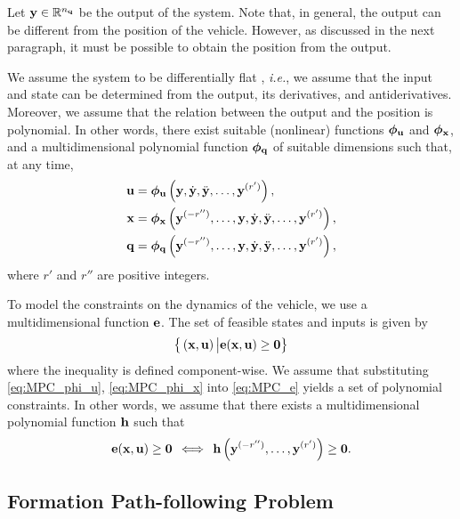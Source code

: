 Let $\mathbf{y} \in \mathbb{R}^{n_{\mathbf{q}}}$ be the output of the system.
Note that, in general, the output can be different from the position of the vehicle.
However, as discussed in the next paragraph, it must be possible to obtain the position from the output.

We assume the system to be differentially flat \cite{fliess_1995_flatness}, \emph{i.e.}, we assume that the input and state can be determined from the output, its derivatives, and antiderivatives. Moreover, we assume that the relation between the output and the position is polynomial.
In other words, there exist suitable (nonlinear) functions $\bm{\phi}_{\mathbf{u}}$ and $\bm{\phi}_{\mathbf{x}}$, and a multidimensional polynomial function $\bm{\phi}_{\mathbf{q}}$ of suitable dimensions such that, at any time,
%
\begin{align}
    \mathbf{u} &= \bm{\phi}_{\mathbf{u}} \left(\mathbf{y}, \dot{\mathbf{y}}, \ddot{\mathbf{y}}, \ldots, \mathbf{y}^{(r')}\right), \label{eq:MPC_phi_u} \\
    \mathbf{x} &= \bm{\phi}_{\mathbf{x}} \left(\mathbf{y}^{(-r'')}, \ldots, \mathbf{y}, \dot{\mathbf{y}}, \ddot{\mathbf{y}}, \ldots, \mathbf{y}^{(r')}\right), \label{eq:MPC_phi_x} \\ 
    \mathbf{q} &= \bm{\phi}_{\mathbf{q}} \left(\mathbf{y}^{(-r'')}, \ldots, \mathbf{y}, \dot{\mathbf{y}}, \ddot{\mathbf{y}}, \ldots, \mathbf{y}^{(r')}\right), \label{eq:MPC_phi_q}
\end{align}
%
where $r'$ and $r''$ are positive integers.

To model the constraints on the dynamics of the vehicle, we use a multidimensional function $\mathbf{e}$.
The set of feasible states and inputs is given by
\begin{equation}
    \big\{\left(\mathbf{x}, \mathbf{u}\right) \big| \mathbf{e} (\mathbf{x}, \mathbf{u}) \geq \bm{0}\big\}
    \label{eq:MPC_e}
\end{equation}
where the inequality is defined component-wise.
We assume that substituting \eqref{eq:MPC_phi_u}, \eqref{eq:MPC_phi_x} into \eqref{eq:MPC_e} yields a set of polynomial constraints.
In other words, we assume that there exists a multidimensional polynomial function $\mathbf{h}$ such that
\begin{equation}
    \mathbf{e} (\mathbf{x}, \mathbf{u})
    \geq
    \bm{0}
    \, \iff \,
    \mathbf{h} \left( \mathbf{y}^{(-r'')}, \ldots, \mathbf{y}^{(r')} \right)
    \geq
    \bm{0}.
\label{equ:MPC_constraint-h-geq-0}
\end{equation}



\subsection{Formation Path-following Problem}
\label{ssec:MPC_formation-path-following}



